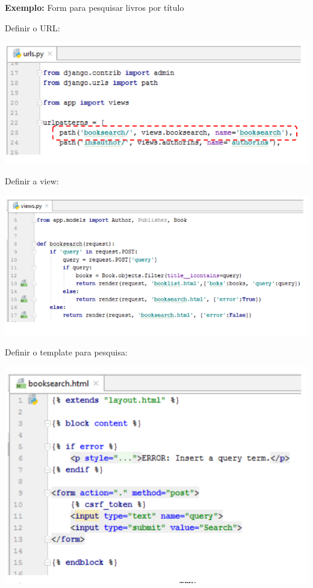 \documentclass{article}
\begin{document}
\begin{flushleft}
  \textbf{Exemplo:} Form para pesquisar livros por título

  \vspace{2mm}
  Definir o URL:

  \begin{center}
    \includegraphics[scale=0.35]{13}
  \end{center}

  \pagebreak

  Definir a view:

  \begin{center}
    \includegraphics[scale=0.35]{14}
  \end{center}

  Definir o template para pesquisa:

  \begin{center}
    \includegraphics[scale=0.35]{15}
  \end{center}


\end{flushleft}
\end{document}
